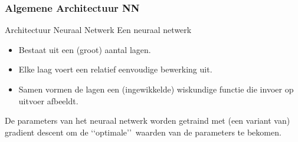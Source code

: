 \documentclass[aspectratio=169]{beamer}
\begin{document}
\begin{frame}
\frametitle{Algemene Architectuur NN}
	
\begin{block}{Architectuur Neuraal Netwerk}
Een neuraal netwerk
\begin{itemize}
\item Bestaat uit een (groot) aantal lagen.
\item Elke laag voert een relatief eenvoudige bewerking uit.
\item Samen vormen de lagen een (ingewikkelde) wiskundige functie die invoer 
op uitvoer afbeeldt.
\end{itemize}
\end{block}

De parameters van het neuraal netwerk worden getraind met (een variant van) gradient descent
om de \lq\lq optimale\rq\rq\ waarden van de parameters te bekomen.
	

\end{frame}


%
%
%
\end{document}

